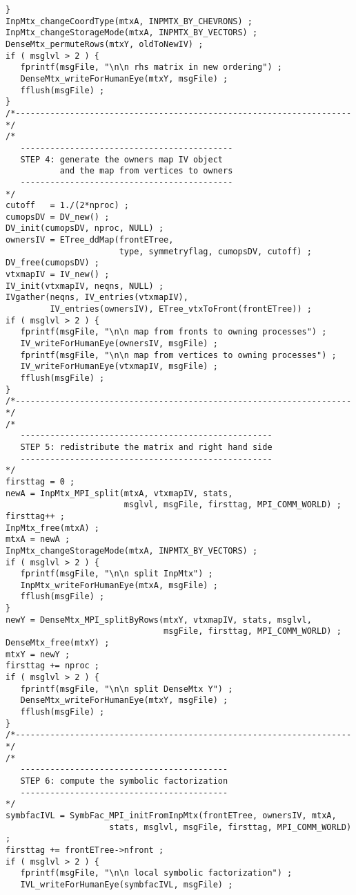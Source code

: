 \begin{verbatim}
}
InpMtx_changeCoordType(mtxA, INPMTX_BY_CHEVRONS) ;
InpMtx_changeStorageMode(mtxA, INPMTX_BY_VECTORS) ;
DenseMtx_permuteRows(mtxY, oldToNewIV) ;
if ( msglvl > 2 ) {
   fprintf(msgFile, "\n\n rhs matrix in new ordering") ;
   DenseMtx_writeForHumanEye(mtxY, msgFile) ;
   fflush(msgFile) ;
}
/*--------------------------------------------------------------------*/
/*
   -------------------------------------------
   STEP 4: generate the owners map IV object
           and the map from vertices to owners
   -------------------------------------------
*/
cutoff   = 1./(2*nproc) ;
cumopsDV = DV_new() ;
DV_init(cumopsDV, nproc, NULL) ;
ownersIV = ETree_ddMap(frontETree, 
                       type, symmetryflag, cumopsDV, cutoff) ;
DV_free(cumopsDV) ;
vtxmapIV = IV_new() ;
IV_init(vtxmapIV, neqns, NULL) ;
IVgather(neqns, IV_entries(vtxmapIV), 
         IV_entries(ownersIV), ETree_vtxToFront(frontETree)) ;
if ( msglvl > 2 ) {
   fprintf(msgFile, "\n\n map from fronts to owning processes") ;
   IV_writeForHumanEye(ownersIV, msgFile) ;
   fprintf(msgFile, "\n\n map from vertices to owning processes") ;
   IV_writeForHumanEye(vtxmapIV, msgFile) ;
   fflush(msgFile) ;
}
/*--------------------------------------------------------------------*/
/*
   ---------------------------------------------------
   STEP 5: redistribute the matrix and right hand side
   ---------------------------------------------------
*/
firsttag = 0 ;
newA = InpMtx_MPI_split(mtxA, vtxmapIV, stats, 
                        msglvl, msgFile, firsttag, MPI_COMM_WORLD) ;
firsttag++ ;
InpMtx_free(mtxA) ;
mtxA = newA ;
InpMtx_changeStorageMode(mtxA, INPMTX_BY_VECTORS) ;
if ( msglvl > 2 ) {
   fprintf(msgFile, "\n\n split InpMtx") ;
   InpMtx_writeForHumanEye(mtxA, msgFile) ;
   fflush(msgFile) ;
}
newY = DenseMtx_MPI_splitByRows(mtxY, vtxmapIV, stats, msglvl, 
                                msgFile, firsttag, MPI_COMM_WORLD) ;
DenseMtx_free(mtxY) ;
mtxY = newY ;
firsttag += nproc ;
if ( msglvl > 2 ) {
   fprintf(msgFile, "\n\n split DenseMtx Y") ;
   DenseMtx_writeForHumanEye(mtxY, msgFile) ;
   fflush(msgFile) ;
}
/*--------------------------------------------------------------------*/
/*
   ------------------------------------------
   STEP 6: compute the symbolic factorization
   ------------------------------------------
*/
symbfacIVL = SymbFac_MPI_initFromInpMtx(frontETree, ownersIV, mtxA,
                     stats, msglvl, msgFile, firsttag, MPI_COMM_WORLD) ;
firsttag += frontETree->nfront ;
if ( msglvl > 2 ) {
   fprintf(msgFile, "\n\n local symbolic factorization") ;
   IVL_writeForHumanEye(symbfacIVL, msgFile) ;

\end{verbatim}
